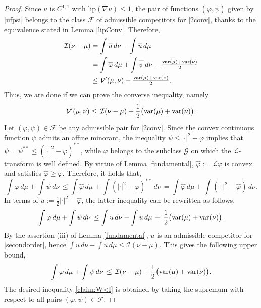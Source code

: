 \documentclass[11pt,letterpaper,reqno]{amsart}
\theoremstyle{definition}
\numberwithin{equation}{section}
\def\f{\varphi}
\newcommand{\ov}{\overline}
\newcommand{\LL}{\mathcal{L}}
\newcommand{\FF}{\mathcal{F}}
\newcommand{\var}{{\rm{var}}}
\newcommand{\Lip}{{\mathrm{lip}}}
\newcommand{\I}{\mathcal{I}}
\newcommand{\G}{\mathcal{G}}
\newcommand{\V}{{\mathcal{V}}}
\begin{document}
{\begin{proof}  Since $\ov u$ is $C^{1,1}$ with $\Lip(\nabla \ov u)\le 1$,  the pair of  functions
	$(\ov\f,\ov\psi)$  given by \eqref{ufpsi} belongs to the class $\FF$ of admissible competitors for \eqref{2conv}, thanks to the equivalence stated in  Lemma \ref{lipConv}. 
	Therefore,
	\begin{align*}
		\I(\nu-\mu) &=  \int \ov u\, d\nu -  \int \ov u\, d\mu\\
		& =   \int \ov\f\, d\mu + \int \ov\psi\, d\nu -\tfrac{\var(\mu)+\var(\nu)}{2}\\
		&\le  \V'(\mu,\nu) -\tfrac{\var(\mu)+\var(\nu)}{2} .
	\end{align*}
	Thus, we are done if we can prove the converse inequality, namely  
	\begin{equation}\label{claim:W<I}
		\V'(\mu,\nu) \le\,  \I(\nu-\mu) + \frac1{2} \big(\var(\mu)+\var(\nu)\big) .
	\end{equation}
	Let $(\f,\psi)\in \FF$ be  any admissible pair for \eqref{2conv}. Since the  convex continuous function  $\psi$  admits an affine minorant,  the inequality $\psi\le |\cdot|^2 -\f$ implies that $\psi=\psi^{**} \le ( |\cdot|^2 -\f)^{**}$, while $\f$ belongs  
	to the subclass $\G$ on which the $\LL$-transform is well defined. By virtue of Lemma \ref{fundamental},  
	$\hat \f:=\LL \f$  is convex and satisfies $\hat\f \ge \f$. Therefore, it holds that,
	$$\int \f \, d\mu + \int \psi\, d\nu \, \le \int \hat \f \, d\mu + \int ( |\cdot|^2 -\f)^{**}\, d\nu\, =\int \hat \f \, d\mu 
	+\int   (|\cdot|^2 -\hat\f)\, d\nu . $$
	In terms of $u:= \frac1{2} |\cdot|^2 - \hat\f$, the latter inequality can be rewritten as follows,
	$$  \int \f \, d\mu + \int \psi\, d\nu\,  \le  \int u\, d\nu -  \int u\, d\mu \, +\,  \frac1{2} \big(\var(\mu)+\var(\nu)\big) .$$
	By the assertion (iii) of Lemma \ref{fundamental},  $u$ is an admissible competitor for \eqref{secondorder},  hence $ \int u\, d\nu - \int u\, d\mu \le \I(\nu-\mu)$. This gives the following upper bound,
	$$  \int \f \, d\mu + \int \psi\, d\nu\,  \le\,  \I(\nu-\mu)+  \frac1{2} \big(\var(\mu)+\var(\nu)\big).$$
	The desired inequality  \eqref{claim:W<I} is obtained by taking the supremum with respect to all pairs $(\f,\psi)\in \FF$.    \end{proof} 




}
\end{document}
